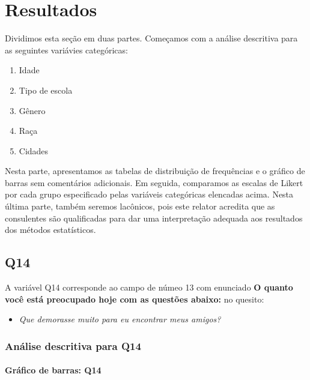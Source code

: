 \documentclass[]{article}
\providecommand{\tightlist}{%
  \setlength{\itemsep}{0pt}\setlength{\parskip}{0pt}}
\let\oldparagraph\paragraph
\renewcommand{\paragraph}[1]{\oldparagraph{#1}\mbox{}}
\begin{document}
\cleardoublepage

\hypertarget{resultados}{%
\section{Resultados}\label{resultados}}

Dividimos esta seção em duas partes. Começamos com a análise descritiva para as seguintes variávies categóricas:

\begin{enumerate}
\def\labelenumi{\roman{enumi}.}
\tightlist
\item
  Idade
\item
  Tipo de escola
\item
  Gênero
\item
  Raça
\item
  Cidades
\end{enumerate}

Nesta parte, apresentamos as tabelas de distribuição de frequências e o gráfico de barras sem comentários adicionais. Em seguida, comparamos as escalas de Likert por cada grupo especificado pelas variáveis categóricas elencadas acima. Nesta última parte, também seremos lacônicos, pois este relator acredita que as consulentes são qualificadas para dar uma interpretação adequada aos resultados dos métodos estatísticos.

\cleardoublepage

\hypertarget{q14}{%
\subsection{Q14}\label{q14}}

A variável Q14 corresponde ao campo de númeo 13 com enunciado \textbf{O quanto você está preocupado hoje com as questões abaixo:} no quesito:

\begin{itemize}
\tightlist
\item
  \emph{Que demorasse muito para eu encontrar meus amigos?}
\end{itemize}

\hypertarget{anuxe1lise-descritiva-para-q14}{%
\subsubsection{Análise descritiva para Q14}\label{anuxe1lise-descritiva-para-q14}}

\hypertarget{gruxe1fico-de-barras-q14}{%
\paragraph{Gráfico de barras: Q14}\label{gruxe1fico-de-barras-q14}}
\end{document}
